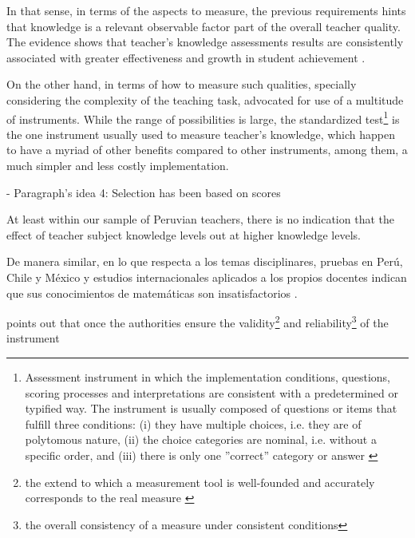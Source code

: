 In that sense, in terms of the aspects to measure, the previous requirements hints that knowledge is a relevant observable factor part of the overall teacher quality. The evidence shows that teacher's knowledge assessments results are consistently associated with greater effectiveness and growth in student achievement \citep{Clotfelter_et_al_2006, Clotfelter_et_al_2007, Kane_et_al_2011, Kane_et_al_2012, Ome_2012, Metzler_et_al_2012, Kane_et_al_2013, Araujo_et_al_2016, Bietenbeck_et_al_2018, Estrada_2019}.

On the other hand, in terms of how to measure such qualities, specially considering the complexity of the teaching task, \citet{Bertoni_et_al_2020b} advocated for use of a multitude of instruments. While the range of possibilities is large, the standardized test\footnote{Assessment instrument in which the implementation conditions, questions, scoring processes and interpretations are consistent with a predetermined or typified way. The instrument is usually composed of questions or items that fulfill three conditions: (i) they have multiple choices, i.e. they are of polytomous nature, (ii) the choice categories are nominal, i.e. without a specific order, and (iii) there is only one ''correct'' category or answer \citep{Rivera_2019}} is the one instrument usually used to measure teacher's knowledge, which happen to have a myriad of other benefits compared to other instruments, among them, a much simpler and less costly implementation.






- Paragraph's idea 4: Selection has been based on scores

At least within our sample of Peruvian teachers, there is no indication that the effect of teacher subject knowledge levels out at higher knowledge levels. \citep{Metzler_et_al_2012}

De manera similar, en lo que respecta a los temas disciplinares, pruebas en Perú, Chile y México y estudios internacionales aplicados a los propios docentes indican que sus conocimientos de matemáticas son insatisfactorios \citep{Elacqua_et_al_2018}.


\citet{Hincapie_et_al_2020} points out that once the authorities ensure the validity\footnote{the extend to which a measurement tool is well-founded and accurately corresponds to the real measure \citep{Kelley_1927}} and reliability\footnote{the overall consistency of a measure under consistent conditions} of the instrument 


